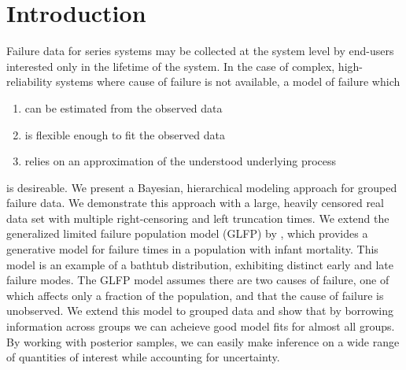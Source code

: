 \documentclass[12pt]{article}
\begin{document}
\section{Introduction}
Failure data for series systems may be collected at the system level by end-users interested only in the lifetime of the system. In the case of complex, high-reliability systems where cause of failure is not available, a model of failure which
\begin{enumerate}[a]
\item can be estimated from the observed data
\item is flexible enough to fit the observed data
\item relies on an approximation of the understood underlying process
\end{enumerate}
is desireable. We present a Bayesian, hierarchical modeling approach for grouped failure data. We demonstrate this approach with a large, heavily censored real data set with multiple right-censoring and left truncation times. We extend the generalized limited failure population model (GLFP) by \citet{chan}, which provides a generative model for failure times in a population with infant mortality. This model is an example of a bathtub distribution, exhibiting distinct early and late failure modes. The GLFP model assumes there are two causes of failure, one of which affects only a fraction of the population, and that the cause of failure is unobserved. We extend this model to grouped data and show that by borrowing information across groups we can acheieve good model fits for almost all groups. By working with posterior samples, we can easily make inference on a wide range of quantities of interest while accounting for uncertainty.
\end{document}
